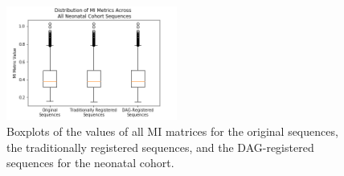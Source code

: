 \clearpage

\begin{figure}
\centering
\includegraphics[width=0.5\textwidth]{6/figures/neonates-mi-box.png}
\caption{Boxplots of the values of all MI matrices for the original sequences, the traditionally registered sequences, and the DAG-registered sequences for the neonatal cohort.}
\label{fig:neonates-mi-box}
\end{figure}

